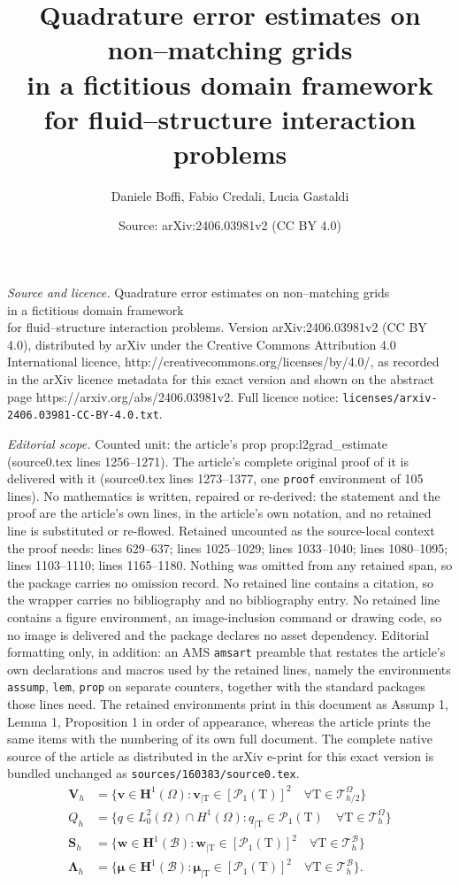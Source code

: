 \documentclass[10pt,a4paper]{amsart}
\title{Quadrature error estimates on non--matching grids\\in a fictitious domain framework\\for fluid--structure interaction problems}
\author{Daniele Boffi, Fabio Credali, Lucia Gastaldi}
\date{Source: arXiv:2406.03981v2 (CC BY 4.0)}
\newcommand\B{\mathcal B} %
\newcommand\HuOm{\mathbf{H}^1(\Omega)} %
\newcommand\Hub{\mathbf{H}^1(\B)} %
\newcommand\LL{{\boldsymbol{\Lambda}}} %
\newcommand\Ldo{L^2_0(\Omega)} %
\newcommand\Pcal{\mathcal{P}}
\renewcommand\S{\mathbf{S}} %
\newcommand\T{\mathcal{T}} %
\newcommand\Vline{\mathbf{V}} %
\newcommand\mmu{{\boldsymbol\mu}} %
\newcommand\tri{\mathrm{T}} %
\renewcommand\v{\mathbf{v}} %
\newcommand\w{\mathbf{w}} %
\begin{document}
\maketitle

\noindent\emph{Source and licence.} Quadrature error estimates on non--matching grids\\in a fictitious domain framework\\for fluid--structure interaction problems. Version arXiv:2406.03981v2 (CC BY 4.0), distributed by arXiv under the Creative Commons Attribution 4.0 International licence, http://creativecommons.org/licenses/by/4.0/, as recorded in the arXiv licence metadata for this exact version and shown on the abstract page https://arxiv.org/abs/2406.03981v2. Full licence notice: \texttt{licenses/arxiv-2406.03981-CC-BY-4.0.txt}.\par\smallskip

\noindent\textit{Editorial scope.} Counted unit: the article's prop prop:l2grad\_estimate (source0.tex lines 1256--1271). The article's complete original proof of it is delivered with it (source0.tex lines 1273--1377, one \texttt{proof} environment of 105 lines). No mathematics is written, repaired or re-derived: the statement and the proof are the article's own lines, in the article's own notation, and no retained line is substituted or re-flowed.  Retained uncounted as the source-local context the proof needs: lines 629--637; lines 1025--1029; lines 1033--1040; lines 1080--1095; lines 1103--1110; lines 1165--1180.  Nothing was omitted from any retained span, so the package carries no omission record.  No retained line contains a citation, so the wrapper carries no bibliography and no bibliography entry.  No retained line contains a figure environment, an image-inclusion command or drawing code, so no image is delivered and the package declares no asset dependency.  Editorial formatting only, in addition: an AMS \texttt{amsart} preamble that restates the article's own declarations and macros used by the retained lines, namely the environments \texttt{assump}, \texttt{lem}, \texttt{prop} on separate counters, together with the standard packages those lines need.  The retained environments print in this document as Assump 1, Lemma 1, Proposition 1 in order of appearance, whereas the article prints the same items with the numbering of its own full document.  The complete native source of the article as distributed in the arXiv e-print for this exact version is bundled unchanged as \texttt{sources/160383/source0.tex}.
	\begin{equation}\label{eq:element}
		\begin{aligned}
			\Vline_h &= \{ \v\in\HuOm: \v_{\mid
				\tri}\in[\Pcal_1(\tri)]^2 \quad \forall \tri\in\T_{h/2}^\Omega \} \\
			Q_h &= \{q\in \Ldo\cap H^1(\Omega): q_{\mid \tri}\in \Pcal_1(\tri)\quad\forall \tri\in\T_{h}^\Omega\}\\
			\S_h &= \{\w\in\Hub:\w_{\mid \tri}\in [\Pcal_1(\tri)]^2\quad\forall \tri\in\mathcal{T}_{h}^\B\}\\
			\LL_h&=\{\mmu\in\Hub:\mmu_{\mid \tri}\in [\Pcal_1(\tri)]^2\quad\forall \tri\in\mathcal{T}_{h}^\B\}.
		\end{aligned}
	\end{equation}
\end{document}
